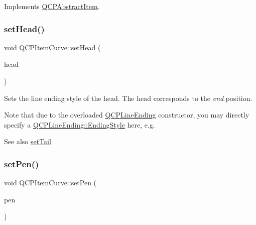 Implements \mbox{\hyperlink{class_q_c_p_abstract_item_ae41d0349d68bb802c49104afd100ba2a}{Q\+C\+P\+Abstract\+Item}}.

\mbox{\label{class_q_c_p_item_curve_a08a30d9cdd63995deea3d9e20430676f}} 
\subsubsection{\texorpdfstring{setHead()}{setHead()}}
{\footnotesize\ttfamily void Q\+C\+P\+Item\+Curve\+::set\+Head (\begin{DoxyParamCaption}\item[{const \mbox{\hyperlink{class_q_c_p_line_ending}{Q\+C\+P\+Line\+Ending}} \&}]{head }\end{DoxyParamCaption})}

Sets the line ending style of the head. The head corresponds to the {\itshape end} position.

Note that due to the overloaded \mbox{\hyperlink{class_q_c_p_line_ending}{Q\+C\+P\+Line\+Ending}} constructor, you may directly specify a \mbox{\hyperlink{class_q_c_p_line_ending_a5ef16e6876b4b74959c7261d8d4c2cd5}{Q\+C\+P\+Line\+Ending\+::\+Ending\+Style}} here, e.\+g.
\begin{DoxyCode}{0}
\end{DoxyCode}


\begin{DoxySeeAlso}{See also}
\mbox{\hyperlink{class_q_c_p_item_curve_ac3488d8b1a6489c845dc5bff3ef71124}{set\+Tail}} 
\end{DoxySeeAlso}
\mbox{\label{class_q_c_p_item_curve_a034be908440aec785c34b92843461221}} 
\subsubsection{\texorpdfstring{setPen()}{setPen()}}
{\footnotesize\ttfamily void Q\+C\+P\+Item\+Curve\+::set\+Pen (\begin{DoxyParamCaption}\item[{const Q\+Pen \&}]{pen }\end{DoxyParamCaption})}

